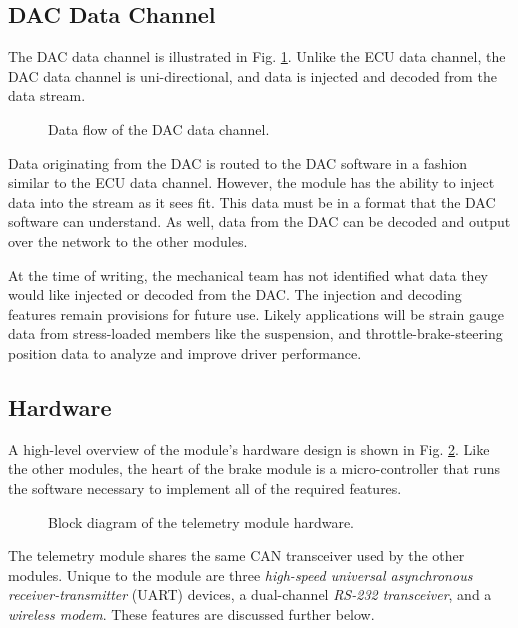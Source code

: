 \subsection{DAC Data Channel}

The DAC data channel is illustrated in Fig. \ref{fig:dac_data_channel}. Unlike the ECU data channel, the DAC data channel is uni-directional, and data is injected and decoded from the data stream.

\begin{figure}[H]
	\centering
	
	\caption{Data flow of the DAC data channel.}
	\label{fig:dac_data_channel}
\end{figure}

Data originating from the DAC is routed to the DAC software in a fashion similar to the ECU data channel. However, the module has the ability to inject data into the stream as it sees fit. This data must be in a format that the DAC software can understand. As well, data from the DAC can be decoded and output over the network to the other modules. 

At the time of writing, the mechanical team has not identified what data they would like injected or decoded from the DAC. The injection and decoding features remain provisions for future use. Likely applications will be strain gauge data from stress-loaded members like the suspension, and throttle-brake-steering position data to analyze and improve driver performance.

\subsection{Hardware}

A high-level overview of the module's hardware design is shown in Fig. \ref{fig:telemetry_hardware_block}. Like the other modules, the heart of the brake module is a micro-controller that runs the software necessary to implement all of the required features. 

\begin{figure}[H]
\centering

\caption{Block diagram of the telemetry module hardware.}
\label{fig:telemetry_hardware_block}
\end{figure}


The telemetry module shares the same CAN transceiver used by the other modules. Unique to the module are three \emph{high-speed universal asynchronous receiver-transmitter} (UART) devices, a dual-channel \emph{RS-232 transceiver}, and a \emph{wireless modem}. These features are discussed further below.

